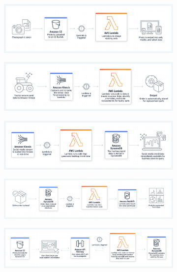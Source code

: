 \documentclass[11pt]{article}
\begin{document}
\begin{figure}[!htbp]
	\begin{subfigure}[b]{0.49\linewidth}
		\centering
		\includegraphics[width=\linewidth]{figs/eg3}
		\caption{}
		\label{figs:eg3}
	\end{subfigure}
	\begin{subfigure}[b]{0.49\linewidth}
		\centering
		\includegraphics[width=\linewidth]{figs/eg6}
		\caption{}
		\label{figs:eg6}
	\end{subfigure}
	\begin{subfigure}[b]{\linewidth}
		\centering
		\includegraphics[width=0.8\linewidth]{figs/eg4}
		\caption{}
		\label{figs:eg4}
	\end{subfigure}
	\begin{subfigure}[b]{\linewidth}
		\centering
		\includegraphics[width=0.8\linewidth]{figs/eg5}
		\caption{}
		\label{figs:eg5}
	\end{subfigure}
	\begin{subfigure}[b]{\linewidth}
		\centering
		\includegraphics[width=0.8\linewidth]{figs/eg1}

\end{subfigure}
\end{figure}
\end{document}

